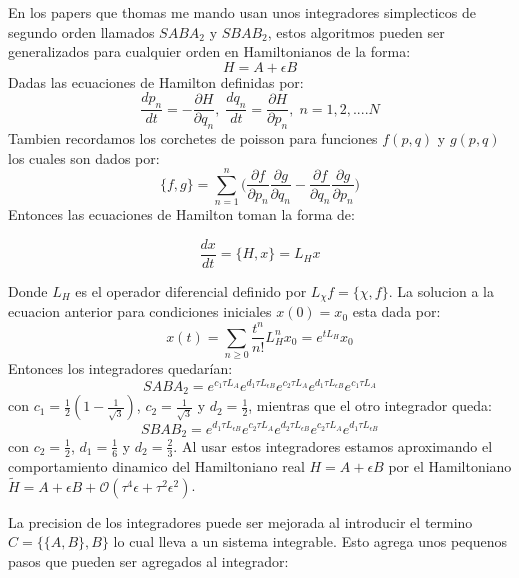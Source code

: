 \documentclass[idxtotoc,hyperref,openany]{labbook} %
\begin{document}
En los papers que thomas me mando usan unos integradores simplecticos de segundo orden llamados $SABA_2$ y $SBAB_2$, estos algoritmos pueden ser generalizados para cualquier orden en Hamiltonianos de la forma:
\begin{equation}
H=A+\epsilon B
\end{equation} 
Dadas las ecuaciones de Hamilton definidas por:
\begin{equation}
\frac{dp_n}{dt} =-\frac{\partial H}{\partial q_n},\; \frac{dq_n}{dt}=\frac{\partial H}{\partial p_n},\; n=1,2,....N
\end{equation}
Tambien recordamos los corchetes de poisson para funciones $f(p,q)$ y $g(p,q)$ los cuales son dados por:
\begin{equation}
\{ f,g \} =\sum_{n=1}^n \bigg( \frac{\partial f}{\partial p_n}\frac{\partial g}{\partial q_n}-\frac{\partial f}{\partial q_n}\frac{\partial g}{\partial p_n}\bigg)
\end{equation}
Entonces las ecuaciones de Hamilton toman la forma de:

\begin{equation}
\frac{dx}{dt}=\{H,x\}=L_H x
\end{equation}

Donde $L_H$ es el operador diferencial definido por $L_\chi f=\{ \chi ,f\}$. La solucion a la ecuacion anterior para condiciones iniciales $x(0)=x_0$ esta dada por:
\begin{equation}
x(t)=\sum_{n\geq 0}\frac{t^n}{n!}L_H^n x_0=e^{tL_H}x_0
\end{equation}
Entonces los integradores quedarían:
\begin{equation}
SABA_2=e^{c_1\tau L_A}e^{d_1\tau L_{\epsilon B}}e^{c_2\tau L_A}e^{d_1\tau L_{\epsilon B}}e^{c_1\tau L_A}
\end{equation}
con $c_1=\frac{1}{2}(1-\frac{1}{\sqrt{3}})$, $c_2=\frac{1}{\sqrt{3}}$ y $d_2=\frac{1}{2}$, mientras que el otro integrador queda:
\begin{equation}
SBAB_2=e^{d_1\tau L_{\epsilon B}}e^{c_2\tau L_A}e^{d_2\tau L_{\epsilon B}}e^{c_2\tau L_A}e^{d_1\tau L_{\epsilon B}}
\end{equation}
con $c_2=\frac{1}{2}$, $d_1=\frac{1}{6}$ y $d_2=\frac{2}{3}$. Al usar estos integradores estamos aproximando el comportamiento dinamico del Hamiltoniano real $H=A+\epsilon B$ por el Hamiltoniano $\widetilde{H} = A+\epsilon B + \mathcal{O} (\tau ^4\epsilon +\tau ^2 \epsilon ^2)$.\par 
La precision de los integradores puede ser mejorada al introducir el termino $C=\{\{A,B\},B\}$ lo cual lleva a un sistema integrable. Esto agrega unos pequenos pasos que pueden ser agregados al integrador:
\end{document}
